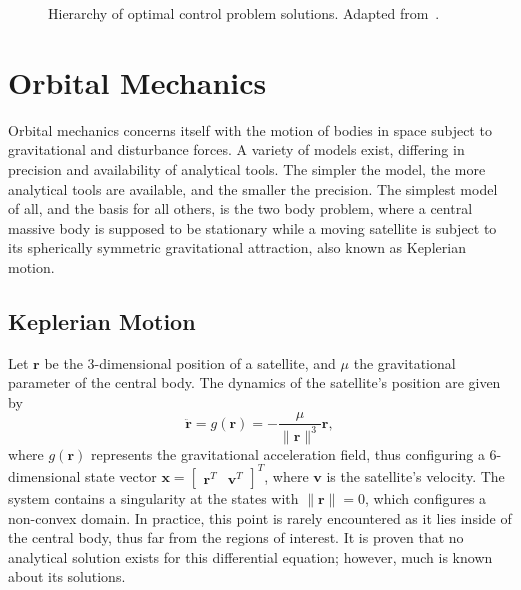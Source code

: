 \begin{figure}[htbp]
    \centering
    \caption{Hierarchy of optimal control problem solutions. Adapted from~.}
    \label{fig:opt_sol_hierarchy}
\end{figure}

\section{Orbital Mechanics}

Orbital mechanics concerns itself with the motion of bodies in space subject to gravitational and disturbance forces. A variety of models exist, differing in precision and availability of analytical tools. The simpler the model, the more analytical tools are available, and the smaller the precision. The simplest model of all, and the basis for all others, is the two body problem, where a central massive body is supposed to be stationary while a moving satellite is subject to its spherically symmetric gravitational attraction, also known as Keplerian motion.

\subsection{Keplerian Motion}

Let \(\mathbf{r}\) be the 3-dimensional position of a satellite, and \(\mu \) the gravitational parameter of the central body. The dynamics of the satellite's position are given by~\cite{curtis2015orbital}
\begin{equation} \label{eq:kepler_dyn}
    \ddot{\mathbf{r}} = g(\mathbf{r}) = -\frac{\mu}{\lVert \mathbf{r} \rVert^3} \mathbf{r},
\end{equation}
where \(g(\mathbf{r})\) represents the gravitational acceleration field, thus configuring a 6-dimensional state vector \(\mathbf{x} = \begin{bmatrix}
    \mathbf{r}^T & \mathbf{v}^T
\end{bmatrix}^T\), where \(\mathbf{v}\) is the satellite's velocity. The system contains a singularity at the states with \(\lVert \mathbf{r} \rVert = 0\), which configures a non-convex domain. In practice, this point is rarely encountered as it lies inside of the central body, thus far from the regions of interest. It is proven that no analytical solution exists for this differential equation; however, much is known about its solutions.

